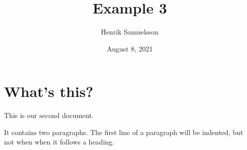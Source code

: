 \documentclass[a4paper, 11pt]{article}
\begin{document}
    \title{Example 3}
    \author{Henrik Samuelsson}
    \date{August 8, 2021}
    \maketitle
    \section{What's this?}
    This        is    our
    second document.

    It contains two paragraphs. The first line of a paragraph will be
    indented, but not when when it follows a heading.
\end{document}
